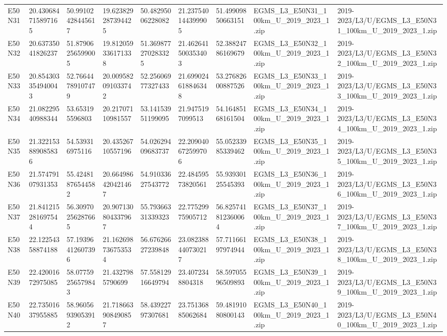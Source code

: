 \begin{landscape}
\begin{longtable}{lllllllll}
E50N31 & 20.430684715897165 & 50.99102428445617 & 19.623829287394425 & 50.48295006228082 & 21.237540144399905 & 51.49909850663151 & EGMS\_L3\_E50N31\_100km\_U\_2019\_2023\_1.zip & 2019-2023/L3/U/EGMS\_L3\_E50N31\_100km\_U\_2019\_2023\_1.zip \\
E50N32 & 20.63735041826237 & 51.87906256599005 & 19.812059336171338 & 51.369877270283325 & 21.462641500353403 & 52.38824786169679 & EGMS\_L3\_E50N32\_100km\_U\_2019\_2023\_1.zip & 2019-2023/L3/U/EGMS\_L3\_E50N32\_100km\_U\_2019\_2023\_1.zip \\
E50N33 & 20.854303354940043 & 52.76644789107479 & 20.009582091033742 & 52.25606977327433 & 21.699024618846348 & 53.27682600887526 & EGMS\_L3\_E50N33\_100km\_U\_2019\_2023\_1.zip & 2019-2023/L3/U/EGMS\_L3\_E50N33\_100km\_U\_2019\_2023\_1.zip \\
E50N34 & 21.08229540988344 & 53.653195596803 & 20.21707110981557 & 53.14153951199095 & 21.9475197099513 & 54.16485168161504 & EGMS\_L3\_E50N34\_100km\_U\_2019\_2023\_1.zip & 2019-2023/L3/U/EGMS\_L3\_E50N34\_100km\_U\_2019\_2023\_1.zip \\
E50N35 & 21.322153889085836 & 54.539316975116 & 20.43526710557196 & 54.02629409683737 & 22.209040672599706 & 55.05233985339462 & EGMS\_L3\_E50N35\_100km\_U\_2019\_2023\_1.zip & 2019-2023/L3/U/EGMS\_L3\_E50N35\_100km\_U\_2019\_2023\_1.zip \\
E50N36 & 21.57479107931353 & 55.42481876544582 & 20.664986420421467 & 54.91033627543772 & 22.48459573820561 & 55.93930125545393 & EGMS\_L3\_E50N36\_100km\_U\_2019\_2023\_1.zip & 2019-2023/L3/U/EGMS\_L3\_E50N36\_100km\_U\_2019\_2023\_1.zip \\
E50N37 & 21.841215281697544 & 56.30970256287665 & 20.907130804337967 & 55.79366331339323 & 22.77529975905712 & 56.825741812360064 & EGMS\_L3\_E50N37\_100km\_U\_2019\_2023\_1.zip & 2019-2023/L3/U/EGMS\_L3\_E50N37\_100km\_U\_2019\_2023\_1.zip \\
E50N38 & 22.12254358874188 & 57.19396412607396 & 21.162698736753534 & 56.67626627239848 & 23.082388440730217 & 57.71166197974944 & EGMS\_L3\_E50N38\_100km\_U\_2019\_2023\_1.zip & 2019-2023/L3/U/EGMS\_L3\_E50N38\_100km\_U\_2019\_2023\_1.zip \\
E50N39 & 22.42001672975085 & 58.07759256579843 & 21.4327985790699 & 57.55812916649794 & 23.4072348804318 & 58.59705596509893 & EGMS\_L3\_E50N39\_100km\_U\_2019\_2023\_1.zip & 2019-2023/L3/U/EGMS\_L3\_E50N39\_100km\_U\_2019\_2023\_1.zip \\
E50N40 & 22.73501637955885 & 58.96056939053912 & 21.718663908490857 & 58.43922797307681 & 23.75136885062684 & 59.48191080800143 & EGMS\_L3\_E50N40\_100km\_U\_2019\_2023\_1.zip & 2019-2023/L3/U/EGMS\_L3\_E50N40\_100km\_U\_2019\_2023\_1.zip \\

\end{longtable}
\end{landscape}
